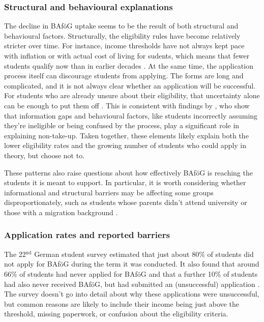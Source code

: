 \subsubsection*{Structural and behavioural explanations}
\label{subsection:structural-and-behavioural-explanations}
The decline in BAföG uptake seems to be the result of both structural and behavioural factors. Structurally, the eligibility rules have become relatively stricter over time. For instance, income thresholds have not always kept pace with inflation or with actual cost of living for sudents, which means that fewer students qualify now than in earlier decades \citep{meier_bafog_2024}. At the same time, the application process itself can discourage students from applying. The forms are long and complicated, and it is not always clear whether an application will be successful. For students who are already unsure about their eligibility, that uncertainty alone can be enough to put them off \citep{kroher_studierendenbefragung_2023}. This is consistent with findings by \citep{fidan_why_2021}, who show that information gaps and behavioural factors, like students incorrectly assuming they’re ineligible or being confused by the process, play a significant role in explaining non-take-up. Taken together, these elements likely explain both the lower eligibility rates and the growing number of students who could apply in theory, but choose not to.

These patterns also raise questions about how effectively BAföG is reaching the students it is meant to support. In particular, it is worth considering whether informational and structural barriers may be affecting some groups disproportionately, such as students whose parents didn’t attend university or those with a migration background \citep{kroher_studierendenbefragung_2023}.

\subsubsection*{Application rates and reported barriers}
\label{subsection:application-rates-and-reported-barriers}
The 22\( ^\text{nd} \) German student survey estimated that just about 80\% of students did not apply for BAföG during the term it was conducted. It also found that around 66\% of students had never applied for BAföG and that a further 10\% of students had also never received BAföG, but had submitted an (unsuccessful) application \citep{kroher_studierendenbefragung_2023}. The survey doesn’t go into detail about why these applications were unsuccessful, but common reasons are likely to include their income being just above the threshold, missing paperwork, or confusion about the eligibility criteria. 

